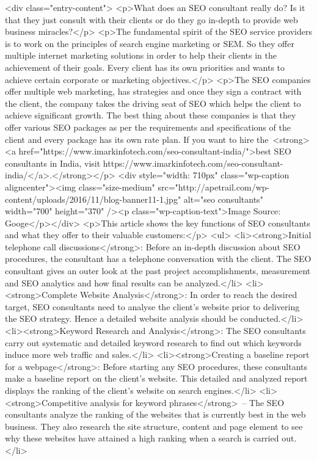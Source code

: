 				<div class="entry-content">
			<p>What does an SEO consultant really do? Is it that they just consult with their clients or do they go in-depth to provide web business miracles?</p>
<p>The fundamental spirit of the SEO service providers is to work on the principles of search engine marketing or SEM. So they offer multiple internet marketing solutions in order to help their clients in the achievement of their goals. Every client has its own priorities and wants to achieve certain corporate or marketing objectives.</p>
<p>The SEO companies offer multiple web marketing, has strategies and once they sign a contract with the client, the company takes the driving seat of SEO which helps the client to achieve significant growth. The best thing about these companies is that they offer various SEO packages as per the requirements and specifications of the client and every package has its own rate plan. If you want to hire the <strong><a href="https://www.imarkinfotech.com/seo-consultant-india/">best SEO consultants in India, visit https://www.imarkinfotech.com/seo-consultant-india/</a>.</strong></p>
<div style="width: 710px" class="wp-caption aligncenter"><img class="size-medium" src="http://apetrail.com/wp-content/uploads/2016/11/blog-banner11-1.jpg" alt="seo consultants" width="700" height="370" /><p class="wp-caption-text">Image Source: Googe</p></div>
<p>This article shows the key functions of SEO consultants and what they offer to their valuable customers:</p>
<ul>
<li><strong>Initial telephone call discussions</strong>: Before an in-depth discussion about SEO procedures, the consultant has a telephone conversation with the client. The SEO consultant gives an outer look at the past project accomplishments, measurement and SEO analytics and how final results can be analyzed.</li>
<li><strong>Complete Website Analysis</strong>: In order to reach the desired target, SEO consultants need to analyse the client’s website prior to delivering the SEO strategy. Hence a detailed website analysis should be conducted.</li>
<li><strong>Keyword Research and Analysis</strong>: The SEO consultants carry out systematic and detailed keyword research to find out which keywords induce more web traffic and sales.</li>
<li><strong>Creating a baseline report for a webpage</strong>: Before starting any SEO procedures, these consultants make a baseline report on the client’s website. This detailed and analyzed report displays the ranking of the client’s website on search engines.</li>
<li><strong>Competitive analysis for keyword phrases</strong> – The SEO consultants analyze the ranking of the websites that is currently best in the web business. They also research the site structure, content and page element to see why these websites have attained a high ranking when a search is carried out.</li>
